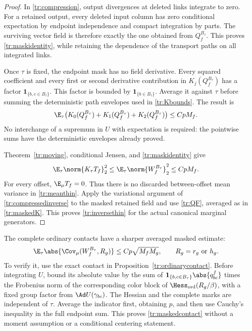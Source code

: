 \begin{proof}
In \eqref{tr:compression}, output divergences at deleted links integrate
to zero. For a retained output, every deleted input column has zero conditional
expectation by endpoint independence and compact integration by parts. The
surviving vector field is therefore exactly the one obtained from
\(Q_f^{B_\tau}\). This proves \eqref{tr:maskidentity}, while retaining
the dependence of the transport paths on all integrated links.

Once \(\tau\) is fixed, the endpoint mask has no field derivative. Every
squared coefficient and every first or second derivative contribution in
\(K_j(Q_f^{B_\tau})\) has a factor
\(\mathbf 1_{\{b,c\in B_\tau\}}\). This factor is bounded by
\(\mathbf 1_{\{b\in B_\tau\}}\). Average it against \(\tau\) before
summing the deterministic path envelopes used in
\eqref{tr:Kbounds}. The result is
\begin{equation}
 \E_\tau\bigl(K_0(Q_f^{B_\tau})+K_1(Q_f^{B_\tau})
                         +K_2(Q_f^{B_\tau})\bigr)\le CpM_f.
 \label{tr:maskedK}
\end{equation}
No interchange of a supremum in \(U\) with expectation is required: the
pointwise sums have the deterministic envelopes already proved.

Theorem~\ref{tr:moving}, conditional Jensen, and
\eqref{tr:maskidentity} give
\[
 \E_\tau\norm{K_\tau T_f}_2^2
 \le\E_\tau\norm{W_f^{B_\tau}}_2^2\le CpM_f.
\]
For every offset, \(\E_\mu T_f=0\). Thus there is no discarded
between-offset mean variance in \eqref{tr:meanthin}. Apply the variational
argument of \eqref{tr:compressedinverse} to the masked retained field and
use \eqref{tr:QF}, averaged as in \eqref{tr:maskedK}. This proves
\eqref{tr:inversethin} for the actual canonical marginal generators.
\end{proof}

The complete ordinary contacts have a sharper averaged masked estimate:
\begin{equation}
 \E_\tau\abs{\Cov_\mu(W_f^{B_\tau},R_g)}
       \le Cp\sqrt{M_fM_g},\qquad R_g=r_g\ \hbox{or}\ h_g.
 \label{tr:maskedcontact}
\end{equation}
To verify it, use the exact contact in
Proposition~\ref{tr:ordinarycontact}. Before integrating \(U\), bound its
absolute value by the sum of
\(\mathbf 1_{\{b,c\in B_\tau\}}\abs{q^f_{bc}}\) times the Frobenius
norm of the corresponding color block of
\(\Hess_{\rm ord}(R_g/\beta)\), with a fixed group factor from
\(\Ad U(\gamma_{bc})\). The Hessian and the complete marks are independent
of \(\tau\). Average the indicator first, obtaining \(p\), and then use
Cauchy's inequality in the full endpoint sum. This proves
\eqref{tr:maskedcontact} without a moment assumption or a conditional
centering statement.

